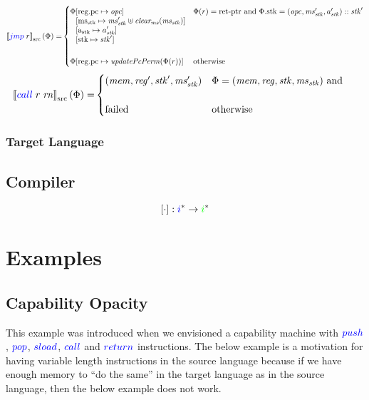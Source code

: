 \documentclass[a4paper]{article}
\newcommand{\sem}[1]{\left\llbracket #1 \right\rrbracket}
\newcommand{\ssem}[2][\Phi]{\sem{#2}_{\mathrm{src}}(#1)}
\newcommand{\fun}{\rightarrow}
\newcommand{\sourcecolor}[1]{\color{blue}}
\newcommand{\src}[1]{{\sourcecolor{} #1}}
\newcommand{\targetcolor}[1]{\color{green}}
\newcommand{\trg}[1]{{\targetcolor{} #1}}
\newcommand{\zinstr}[1]{#1}
\newcommand{\oneinstr}[2]{
  \ifthenelse{\equal{#2}{}}
  {\zinstr{#1}}
  {\zinstr{#1} \; #2}
}
\newcommand{\twoinstr}[3]{
  \ifthenelse{\equal{#2#3}{}}
  {\zinstr{#1}}
  {\zinstr{#1} \; #2 \; #3}
}
\newcommand{\sreturn}{\zinstr{\src{return}}}
\newcommand{\sjmp}[1]{\oneinstr{\src{jmp}}{#1}}
\newcommand{\spush}[1]{\oneinstr{\src{push}}{#1}}
\newcommand{\spop}[1]{\oneinstr{\src{pop}}{#1}}
\newcommand{\ssload}[2]{\twoinstr{\src{sload}}{#1}{#2}}
\newcommand{\scall}[2]{\twoinstr{\src{call}}{#1}{#2}}
\newcommand{\update}[2]{[#1 \mapsto #2]}
\newcommand{\updReg}[3][\Phi]{#1\update{\sreg.#2}{#3}}
\newcommand{\updPc}[2][\Phi]{\updReg[#1]{\pcreg}{#2}}
\newcommand{\sourcedom}[1]{\mathrm{#1}}
\newcommand{\sreg}{\sourcedom{reg}}
\newcommand{\sstk}{\sourcedom{stk}}
\newcommand{\smsstk}{\sourcedom{ms_{stk}}}
\newcommand{\sastk}{\sourcedom{a_{stk}}}
\newcommand{\retptr}{\sourcedom{ret\text{-}ptr}}
\newcommand{\failed}{\mathrm{failed}}
\newcommand{\var}[1]{\mathit{#1}}
\newcommand{\rn}{\var{rn}}
\newcommand{\reg}{\var{reg}}
\newcommand{\mem}{\var{mem}}
\newcommand{\ms}{\var{ms}}
\newcommand{\stk}{\var{stk}}
\newcommand{\opc}{\var{opc}}
\newcommand{\pcreg}{\mathrm{pc}}
\newcommand{\comp}[1]{[#1]}
\newcommand{\plainfun}[2]{
  \ifthenelse{\equal{#2}{}}
  {\mathit{#1}}
  {\mathit{#1}(#2)}
}
\newcommand{\updPcPerm}[1]{\plainfun{updatePcPerm}{#1}}
\newcommand{\clearms}[1]{\plainfun{clear_{ms}}{#1}}
\begin{document}
\begin{align*}
  \ssem{\sjmp{r}} = & 
    \begin{cases}
      \Phi
      \begin{aligned}[t]
        & \update{\sreg.\pcreg}{\opc} \\
        & \update{\smsstk}{\ms_\stk' \uplus \clearms{\ms_\stk}}\\
        & \update{\sastk}{a_\stk'}\\
        & \update{\sstk}{\stk'}
      \end{aligned} & \Phi(r) = \retptr \text{ and }
      \Phi.\sstk = (\opc,\ms_\stk',a_\stk') :: \stk'\\
      & \\
      \updPc{\updPcPerm{\Phi(r)}} & \text{otherwise}
    \end{cases} \\
\end{align*}
\begin{align*}
  \ssem{\scall{r}{\rn}} = & 
    \begin{cases}
      (\mem,\reg',\stk',\ms_\stk') & \Phi = (\mem,\reg,\stk,\ms_\stk) \text{ and }\\
      \\
      \failed & \text{otherwise}
    \end{cases}
\end{align*}

\subsubsection{Target Language}

\subsection{Compiler}
\[
\comp{\cdot} : \src{i}^* \fun \trg{i}^*
\]
\clearpage
\section{Examples}
\subsection{Capability Opacity}
\label{subsec:capability-opacity}
This example was introduced when we envisioned a capability machine with $\spush{}$, $\spop{}$, $\ssload{}{}$, $\scall{}{}$ and $\sreturn$ instructions. The below example is a motivation for having variable length instructions in the source language because if we have enough memory to ``do the same'' in the target language as in the source language, then the below example does not work.
\end{document}
